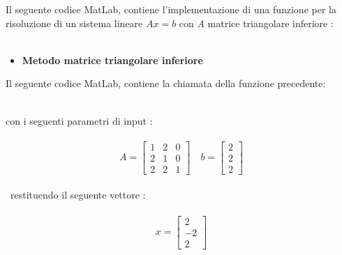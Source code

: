 Il seguente codice MatLab, contiene l'implementazione di una funzione per la risoluzione di un sistema lineare $Ax=b$ con \textit{A} matrice triangolare inferiore :\\\
\begin{itemize}
\item \textbf{Metodo matrice triangolare inferiore}

\end{itemize}
Il seguente codice MatLab, contiene la chiamata della funzione precedente:\\\

con i seguenti parametri di input :\\\
\[
A =\begin{bmatrix}
	1 & 2 & 0 \\ 
	2 & 1 & 0 \\
	2 & 2 & 1 
\end{bmatrix} \quad
b =\begin{bmatrix}
  2 \\
  2 \\
  2
\end{bmatrix}
\]\\\
restituendo il seguente vettore :\\\
\[
x =\begin{bmatrix}
  2 \\
  -2 \\
  2
\end{bmatrix}
\]